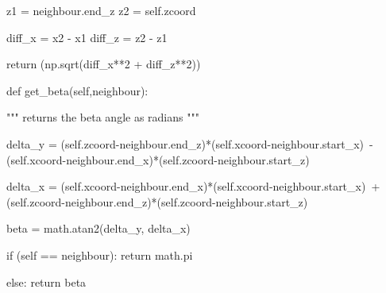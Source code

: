 \documentclass[a4paper,12pt]{article}
\begin{document}
\begin{python}
                z1 = neighbour.end_z
                z2 = self.zcoord

                diff_x = x2 - x1
                diff_z = z2 - z1

                return (np.sqrt(diff_x**2 + diff_z**2))                
                              

        def get_beta(self,neighbour):

                """
                returns the beta angle as radians
                """

                delta_y = (self.zcoord-neighbour.end_z)*(self.xcoord-neighbour.start_x)\
                        -(self.xcoord-neighbour.end_x)*(self.zcoord-neighbour.start_z)

                delta_x = (self.xcoord-neighbour.end_x)*(self.xcoord-neighbour.start_x)\
                        +(self.zcoord-neighbour.end_z)*(self.zcoord-neighbour.start_z)
               
                beta = math.atan2(delta_y, delta_x)
                 
                if (self == neighbour):
                        return math.pi

                else:
                        return beta
\end{python}
\end{document}
